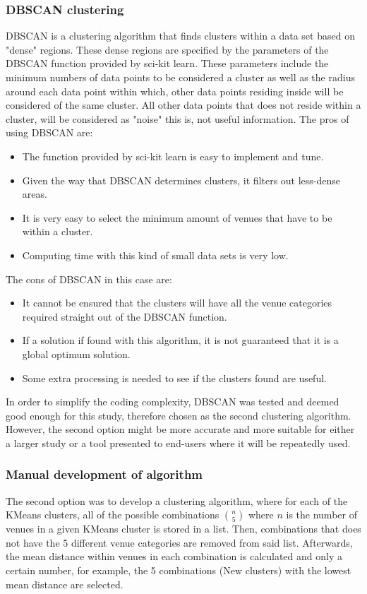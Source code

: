 \documentclass{article}
\begin{document}
		\subsubsection{DBSCAN clustering}
		
		DBSCAN is a clustering algorithm that finds clusters within a data set based on "dense" regions. These dense regions are specified by the parameters of the DBSCAN function provided by sci-kit learn. These parameters include the minimum numbers of data points to be considered a cluster as well as the radius around each data point within which, other data points residing inside will be considered of the same cluster. All other data points that does not reside within a cluster, will be considered as "noise" this is, not useful information.
		The pros of using DBSCAN are:
		\begin{itemize}
			\item The function provided by sci-kit learn is easy to implement and tune.
			\item Given the way that DBSCAN determines clusters, it filters out less-dense areas.
			\item It is very easy to select the minimum amount of venues that have to be within a cluster.
			\item Computing time with this kind of small data sets is very low.
		\end{itemize}
		The cons of DBSCAN in this case are:
		\begin{itemize}
			\item It cannot be ensured that the clusters will have all the venue categories required straight out of the DBSCAN function.
			\item If a solution if found with this algorithm, it is not guaranteed that it is a global optimum solution.
			\item Some extra processing is needed to see if the clusters found are useful.
		\end{itemize}
		
		In order to simplify the coding complexity, DBSCAN was tested and deemed good enough for this study, therefore chosen as the second clustering algorithm. However, the second option might be more accurate and more suitable for either a larger study or a tool presented to end-users where it will be repeatedly used.
		\subsubsection{Manual development of algorithm}
		\label{subsec::MA}
		The second option was to develop a clustering algorithm, where for each of the KMeans clusters, all of the possible combinations $\binom{n}{5}$ where $n$ is the number of venues in a given KMeans cluster is stored in a list. Then, combinations that does not have the 5 different venue categories are removed from said list. Afterwards, the mean distance within venues in each combination is calculated and only a certain number, for example, the 5 combinations (New clusters) with the lowest mean distance are selected.
		
\end{document}
